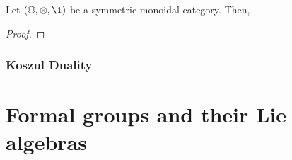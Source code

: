                 \begin{proposition} \label{prop: symmetirc_operads_universal_property}
                    Let $(\O, \tensor, \1)$ be a symmetric monoidal category. Then, 
                \end{proposition}
                    \begin{proof}
                        
                    \end{proof}
                    
            \subsubsection{Koszul Duality}
        
    \section{Formal groups and their Lie algebras} \label{section: lie_algebras_and_formal_groups}